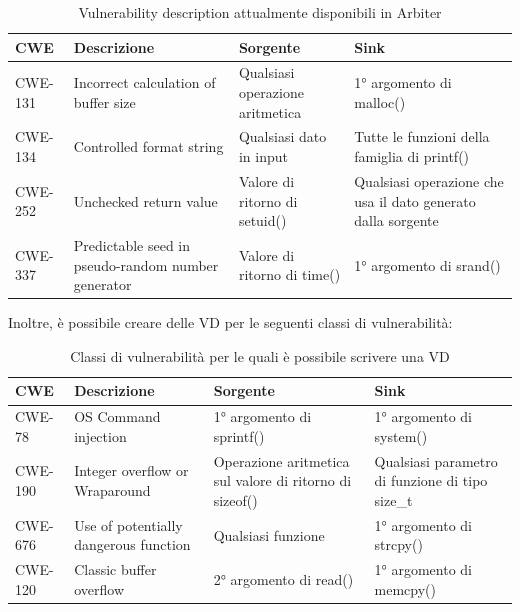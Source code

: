\documentclass[../main.tex]{subfiles}
\begin{document}
\begin{table}[H]
\centering
\begin{tabularx}{\textwidth}{|l|X|X|X|}
\hline
CWE     & Descrizione                                        & Sorgente                        & Sink                                                                                                   \\ \hline
CWE-131 & Incorrect calculation of buffer size               & Qualsiasi operazione aritmetica & 1° argomento di malloc()                                                                               \\ \hline
CWE-134 & Controlled format string                           & Qualsiasi dato in input         & Tutte le funzioni della famiglia di printf()                                                           \\ \hline
CWE-252 & Unchecked return value                             & Valore di ritorno di setuid()   & Qualsiasi operazione che usa il dato generato dalla sorgente                                           \\ \hline
CWE-337 & Predictable seed in pseudo-random number generator & Valore di ritorno di time()     & 1° argomento di srand()                                                                                \\ \hline
\end{tabularx}
\caption{Vulnerability description attualmente disponibili in Arbiter}
\end{table}
\noindent
Inoltre, è possibile creare delle VD per le seguenti classi di vulnerabilità:
\begin{table}[H]
\centering
\begin{tabularx}{\textwidth}{|l|X|X|X|}
\hline
CWE     & Descrizione                                        & Sorgente                        & Sink                                                                                                   \\ \hline
CWE-78 & OS Command injection& 1° argomento di sprintf() & 1° argomento di system()                                                                               \\ \hline
CWE-190 & Integer overflow or Wraparound                           & Operazione aritmetica sul valore di ritorno di sizeof()         & Qualsiasi parametro di funzione di tipo size\_t                                                           \\ \hline
CWE-676 & Use of potentially dangerous function                             & Qualsiasi funzione   & 1° argomento di strcpy()                              \\ \hline
CWE-120 & Classic buffer overflow     & 2° argomento di read() & 1° argomento di memcpy()                                                                                \\ \hline
\end{tabularx}
\caption{Classi di vulnerabilità per le quali è possibile scrivere una VD}
\end{table}
\end{document}
